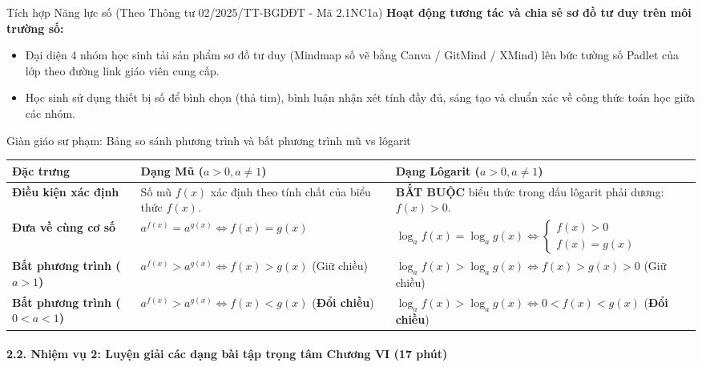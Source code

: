 \documentclass[12pt, a4paper]{article}
\begin{document}
\begin{aibox}{Tích hợp Năng lực số (Theo Thông tư 02/2025/TT-BGDĐT - Mã 2.1NC1a)}
\textbf{Hoạt động tương tác và chia sẻ sơ đồ tư duy trên môi trường số:}
\begin{itemize}[leftmargin=0.6cm]
    \item Đại diện 4 nhóm học sinh tải sản phẩm sơ đồ tư duy (Mindmap số vẽ bằng Canva / GitMind / XMind) lên bức tường số Padlet của lớp theo đường link giáo viên cung cấp.
    \item Học sinh sử dụng thiết bị số để bình chọn (thả tim), bình luận nhận xét tính đầy đủ, sáng tạo và chuẩn xác về công thức toán học giữa các nhóm.
\end{itemize}
\end{aibox}

\begin{scaffoldbox}{Giàn giáo sư phạm: Bảng so sánh phương trình và bất phương trình mũ vs lôgarit}
\begin{center}
\begin{tabular}{|m{2.5cm}|m{5.5cm}|m{6cm}|}
\hline
\textbf{Đặc trưng} & \textbf{Dạng Mũ ($a > 0, a \neq 1$)} & \textbf{Dạng Lôgarit ($a > 0, a \neq 1$)} \\ \hline
\textbf{Điều kiện xác định} & Số mũ $f(x)$ xác định theo tính chất của biểu thức $f(x)$. & \textbf{BẮT BUỘC} biểu thức trong dấu lôgarit phải dương: $f(x) > 0$. \\ \hline
\textbf{Đưa về cùng cơ số} & $a^{f(x)} = a^{g(x)} \iff f(x) = g(x)$ & $\log_a f(x) = \log_a g(x) \iff \begin{cases} f(x) > 0 \\ f(x) = g(x) \end{cases}$ \\ \hline
\textbf{Bất phương trình ($a > 1$)} & $a^{f(x)} > a^{g(x)} \iff f(x) > g(x)$ (Giữ chiều) & $\log_a f(x) > \log_a g(x) \iff f(x) > g(x) > 0$ (Giữ chiều) \\ \hline
\textbf{Bất phương trình ($0 < a < 1$)} & $a^{f(x)} > a^{g(x)} \iff f(x) < g(x)$ (\textbf{Đổi chiều}) & $\log_a f(x) > \log_a g(x) \iff 0 < f(x) < g(x)$ (\textbf{Đổi chiều}) \\ \hline
\end{tabular}
\end{center}
\end{scaffoldbox}

\paragraph{2.2. Nhiệm vụ 2: Luyện giải các dạng bài tập trọng tâm Chương VI (17 phút)}
\end{document}
